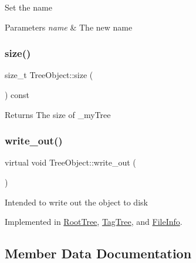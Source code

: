 Set the name 
\begin{DoxyParams}{Parameters}
{\em name} & The new name \\
\hline
\end{DoxyParams}
\mbox{\label{class_tree_object_a2a3dffe29aba8965c7977312c3721b50}} 
\subsubsection{\texorpdfstring{size()}{size()}}
{\footnotesize\ttfamily size\+\_\+t Tree\+Object\+::size (\begin{DoxyParamCaption}{ }\end{DoxyParamCaption}) const}

\begin{DoxyReturn}{Returns}
The size of \+\_\+my\+Tree 
\end{DoxyReturn}
\mbox{\label{class_tree_object_a63708d61353d83e3e03597394bb7aca0}} 
\subsubsection{\texorpdfstring{write\+\_\+out()}{write\_out()}}
{\footnotesize\ttfamily virtual void Tree\+Object\+::write\+\_\+out (\begin{DoxyParamCaption}{ }\end{DoxyParamCaption})\hspace{0.3cm}{\ttfamily [pure virtual]}}

Intended to write out the object to disk 

Implemented in \mbox{\hyperlink{class_root_tree_ad6eefe5d46ee37b3725799897a78c2dd}{Root\+Tree}}, \mbox{\hyperlink{class_tag_tree_adf13e01b25991ecfef1ad958e02c07fe}{Tag\+Tree}}, and \mbox{\hyperlink{class_file_info_a8e835f000ddfd0f1097ccfa7e7801a09}{File\+Info}}.



\subsection{Member Data Documentation}
\mbox{\label{class_tree_object_a17cfa5bde700978b4ec326909362bd2c}} 
